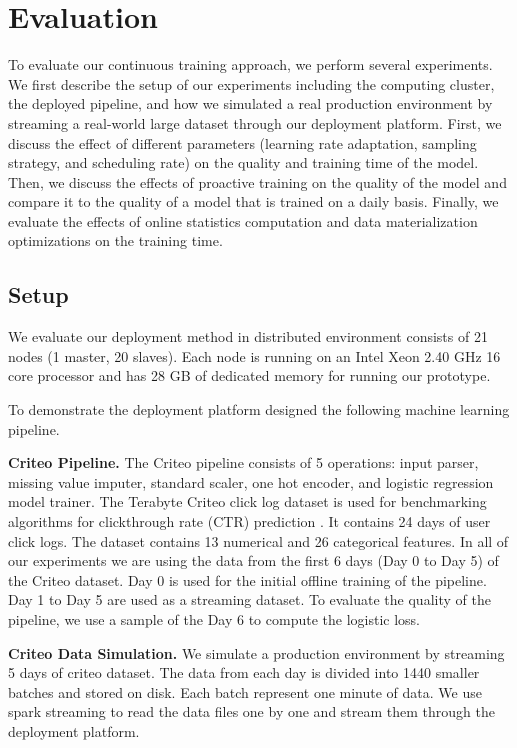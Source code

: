 \section{Evaluation} \label{evaluation} 
To evaluate our continuous training approach, we perform several experiments.
We first describe the setup of our experiments including the computing cluster, the deployed pipeline, and how we simulated a real production environment by streaming a real-world large dataset through our deployment platform.
First, we discuss the effect of different parameters (learning rate adaptation, sampling strategy, and scheduling rate) on the quality and training time of the model.
Then, we discuss the effects of proactive training on the quality of the model and compare it to the quality of a model that is trained on a daily basis.
Finally, we evaluate the effects of online statistics computation and data materialization optimizations on the training time.

\subsection{Setup}\label{subsec:setup}
We evaluate our deployment method in distributed environment consists of 21 nodes (1 master, 20 slaves).
Each node is running on an Intel Xeon 2.40 GHz 16 core processor and has 28 GB of dedicated memory for running our prototype.

To demonstrate the deployment platform designed the following machine learning pipeline.

\textbf{Criteo Pipeline.} 
The Criteo pipeline consists of 5 operations: input parser, missing value imputer, standard scaler, one hot encoder, and logistic regression model trainer. 
The Terabyte Criteo click log dataset is used for benchmarking algorithms for clickthrough rate (CTR) prediction \cite{criteo-log}.
It contains 24 days of user click logs. 
The dataset  contains 13 numerical and 26 categorical features. 
In all of our experiments we are using the data from the first 6 days (Day 0 to Day 5) of the Criteo dataset.
Day 0 is used for the initial offline training of the pipeline.
Day 1 to Day 5 are used as a streaming dataset.
To evaluate the quality of the pipeline, we use a sample of the Day 6 to compute the logistic loss.

\textbf{Criteo Data Simulation.}
We simulate a production environment by streaming 5 days of criteo dataset.
The data from each day is divided into 1440 smaller batches and stored on disk.
Each batch represent one minute of data.
We use spark streaming to read the data files one by one and stream them through the deployment platform. 

